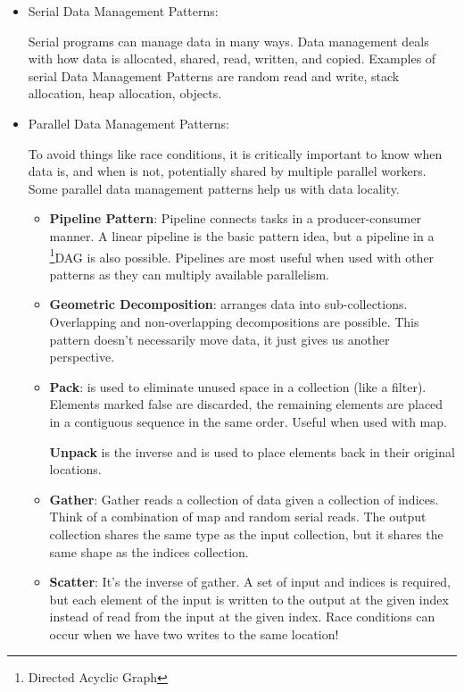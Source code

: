 \begin{itemize}
    \item Serial Data Management Patterns:
    \par Serial programs can manage data in many ways. Data management deals with how data is
    allocated, shared, read, written, and copied. Examples of serial Data Management Patterns are random read and write, stack allocation, heap allocation, objects.
    \item Parallel Data Management Patterns:
    \par To avoid things like race conditions, it is critically important to know when data is, and when is not, potentially shared by multiple parallel workers. Some parallel data management patterns help us with data locality.
%
\clearpage
%
    \begin{itemize}
        \item \textbf{Pipeline Pattern}: Pipeline connects tasks in a producer-consumer manner. A linear pipeline is the basic pattern idea, but a pipeline in a \footnote{Directed Acyclic Graph}{DAG} is also possible. Pipelines are most useful when used with other patterns as they can multiply available parallelism.
        \item \textbf{Geometric Decomposition}: arranges data into sub-collections. Overlapping and non-overlapping decompositions are possible. This pattern doesn’t necessarily move data, it just gives us another perspective.
        \item \textbf{Pack}: is used to eliminate unused space in a collection (like a filter). Elements marked {\color{red} false} are discarded, the remaining elements are placed in a contiguous sequence in the same order. Useful when used with map.
        \par \textbf{Unpack} is the inverse and is used to place elements back in their original locations.
        \item \textbf{Gather}: Gather reads a collection of data given a collection of indices. Think of a combination of map and random serial reads. The output collection shares the same type as the input collection, but it shares the same shape as the indices collection.
        \item \textbf{Scatter}: It's the inverse of gather. A set of input and indices is required, but each element of the input is written to the output at the given index instead of read from the input at the given index. Race conditions can occur when we have two writes to the same location!

\end{itemize}
\end{itemize}
